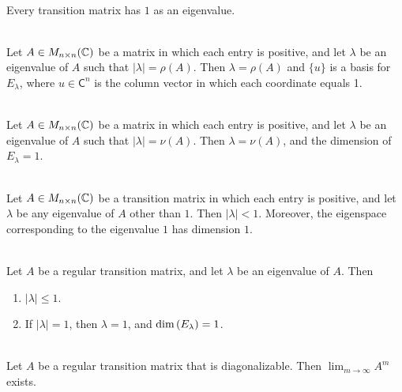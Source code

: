 \begin{theorem}
	\hfill\\
	Every transition matrix has $1$ as an eigenvalue.
\end{theorem}

\begin{theorem}
	\hfill\\
	Let $A \in M_{n \times n}(\mathbb{C})$ be a matrix in which each entry is positive, and let $\lambda$ be an eigenvalue of $A$ such that $|\lambda| = \rho(A)$. Then $\lambda = \rho(A)$ and $\{u\}$ is a basis for $E_\lambda$, where $u \in \mathsf{C}^n$ is the column vector in which each coordinate equals 1.
\end{theorem}

\begin{corollary}
	\hfill\\
	Let $A \in M_{n \times n}(\mathbb{C})$ be a matrix in which each entry is positive, and let $\lambda$ be an eigenvalue of $A$ such that $|\lambda| = \nu(A)$. Then $\lambda = \nu(A)$, and the dimension of $E_\lambda = 1$.
\end{corollary}

\begin{corollary}
	\hfill\\
	Let $A \in M_{n \times n}(\mathbb{C})$ be a transition matrix in which each entry is positive, and let $\lambda$ be any eigenvalue of $A$ other than $1$. Then $|\lambda| < 1$. Moreover, the eigenspace corresponding to the eigenvalue $1$ has dimension $1$.
\end{corollary}

\begin{theorem}
	\hfill\\
	Let $A$ be a regular transition matrix, and let $\lambda$ be an eigenvalue of $A$. Then

	\begin{enumerate}
		\item $|\lambda| \leq 1$.
		\item If $|\lambda| = 1$, then $\lambda = 1$, and $\text{dim}\left(E_\lambda\right) = 1$.
	\end{enumerate}
\end{theorem}

\begin{corollary}
	\hfill\\
	Let $A$ be a regular transition matrix that is diagonalizable. Then $\displaystyle\lim_{m \to \infty}A^m$ exists.
\end{corollary}

